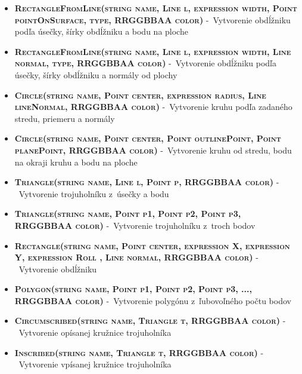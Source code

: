 \begin{itemize}

\item \textsc{\textbf{RectangleFromLine(string name, Line l, expression width, Point pointOnSurface, type, RRGGBBAA color)}} -~Vytvorenie obdĺžniku podľa úsečky, šírky obdĺžniku a bodu na ploche  %
	
\item \textsc{\textbf{RectangleFromLine(string name, Line l, expression width, Line normal, type, RRGGBBAA color)}} -~Vytvorenie obdĺžniku podľa úsečky, šírky obdĺžniku a normály od plochy %

\item \textsc{\textbf{Circle(string name, Point center, expression radius, Line lineNormal, \newline RRGGBBAA color)}} -~Vytvorenie kruhu podľa zadaného stredu, priemeru a normály%
	
\item \textsc{\textbf{Circle(string name, Point center, Point outlinePoint, Point planePoint, RRGGBBAA color)}} -~Vytvorenie kruhu od stredu, bodu na okraji kruhu a bodu na ploche %

\item \textsc{\textbf{Triangle(string name, Line l, Point p, RRGGBBAA color)}} -~Vytvorenie trojuholníku z~úsečky a bodu%
	
\item \textsc{\textbf{Triangle(string name, Point p1, Point p2, Point p3, RRGGBBAA color)}} -~Vytvorenie trojuholníku z~troch bodov%


\item \textsc{\textbf{Rectangle(string name, Point center, expression X, expression Y, expression Roll
    , Line normal, RRGGBBAA color)}} -~Vytvorenie obdĺžniku%

\item \textsc{\textbf{Polygon(string name, Point p1, Point p2, Point p3, ..., RRGGBBAA color)}} -~Vytvorenie polygónu z~ľubovoľného počtu bodov%


\item \textsc{\textbf{Circumscribed(string name, Triangle t, RRGGBBAA color)}}  -~Vytvorenie opísanej kružnice trojuholníka %
	
\item \textsc{\textbf{Inscribed(string name, Triangle t, RRGGBBAA color)}} -~Vytvorenie vpísanej kružnice trojuholníka %
	
\end{itemize}
